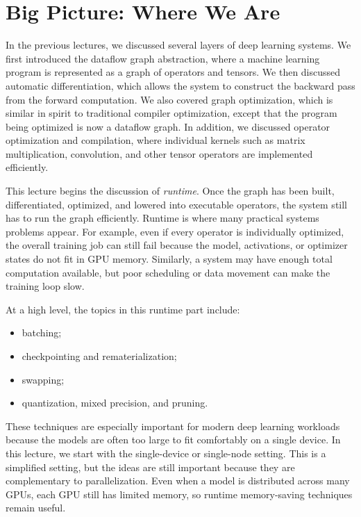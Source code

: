 
\section{Big Picture: Where We Are}

In the previous lectures, we discussed several layers of deep learning systems. We first introduced the dataflow graph abstraction, where a machine learning program is represented as a graph of operators and tensors. We then discussed automatic differentiation, which allows the system to construct the backward pass from the forward computation. We also covered graph optimization, which is similar in spirit to traditional compiler optimization, except that the program being optimized is now a dataflow graph. In addition, we discussed operator optimization and compilation, where individual kernels such as matrix multiplication, convolution, and other tensor operators are implemented efficiently.

This lecture begins the discussion of \emph{runtime}. Once the graph has been built, differentiated, optimized, and lowered into executable operators, the system still has to run the graph efficiently. Runtime is where many practical systems problems appear. For example, even if every operator is individually optimized, the overall training job can still fail because the model, activations, or optimizer states do not fit in GPU memory. Similarly, a system may have enough total computation available, but poor scheduling or data movement can make the training loop slow.

At a high level, the topics in this runtime part include:
\begin{itemize}
    \item batching;
    \item checkpointing and rematerialization;
    \item swapping;
    \item quantization, mixed precision, and pruning.
\end{itemize}

These techniques are especially important for modern deep learning workloads because the models are often too large to fit comfortably on a single device. In this lecture, we start with the single-device or single-node setting. This is a simplified setting, but the ideas are still important because they are complementary to parallelization. Even when a model is distributed across many GPUs, each GPU still has limited memory, so runtime memory-saving techniques remain useful.

